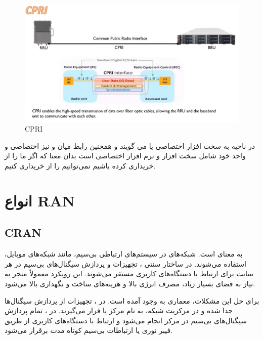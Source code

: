 \documentclass[landscape, 12pt]{report}
\begin{document}
\begin{figure}[ht]
	\centering
	\includegraphics[width=.6\linewidth]{Pic/CPRI}
	\caption{CPRI}
	\label{fig:CPRI}
\end{figure}

در ناحیه
  به
    سخت افزار اختصاصی یا
      می گویند و همچنین رابط میان
         و
           نیز اختصاصی و واحد
             خود شامل سخت افزار و نرم افزار اختصاصی است بدان معنا که اگر ما
               را از
                 خریداری کرده باشیم نمی‌توانیم
                   را از
                     خریداری کنیم.
                     
\chapter*{انواع 
RAN
}

\section*{CRAN}
به معنای
  است. شبکه‌های
    در سیستم‌های ارتباطی بی‌سیم، مانند شبکه‌های موبایل، استفاده می‌شوند. در ساختار سنتی
    ، تجهیزات
      و پردازش سیگنال‌های بی‌سیم در هر سایت برای ارتباط با دستگاه‌های کاربری مستقر می‌شوند. این رویکرد معمولاً منجر به نیاز به فضای بسیار زیاد، مصرف انرژی بالا و هزینه‌های ساخت و نگهداری بالا می‌شود.
  
  برای حل این مشکلات، معماری
    به وجود آمده است. در
     ، تجهیزات
       از پردازش سیگنال‌ها جدا شده و در مرکزیت شبکه، به نام مرکز
         یا
           قرار می‌گیرند. در
            ، تمام پردازش سیگنال‌های بی‌سیم در مرکز
              انجام می‌شود و ارتباط با دستگاه‌های کاربری از طریق فیبر نوری یا ارتباطات بی‌سیم کوتاه مدت برقرار می‌شود.
  
\end{document}
